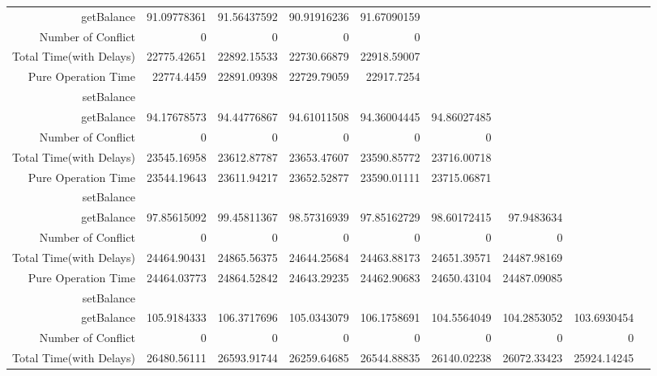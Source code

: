\begin{landscape}
\begin{table}[htbp]
\begin{tabular}{rrrrrrrrr}
    getBalance & 91.09778361 & 91.56437592 & 90.91916236 & 91.67090159 &       &       &       &  \\
    Number of Conflict & 0     & 0     & 0     & 0     &       &       &       &  \\
    Total Time(with Delays) & 22775.42651 & 22892.15533 & 22730.66879 & 22918.59007 &       &       &       &  \\
    Pure Operation Time & 22774.4459 & 22891.09398 & 22729.79059 & 22917.7254 &       &       &       &  \\
    \cline{1-9}
    setBalance &       &       &       &       &       &       &       &  \\
    getBalance & 94.17678573 & 94.44776867 & 94.61011508 & 94.36004445 & 94.86027485 &       &       &  \\
    Number of Conflict & 0     & 0     & 0     & 0     & 0     &       &       &  \\
    Total Time(with Delays) & 23545.16958 & 23612.87787 & 23653.47607 & 23590.85772 & 23716.00718 &       &       &  \\
    Pure Operation Time & 23544.19643 & 23611.94217 & 23652.52877 & 23590.01111 & 23715.06871 &       &       &  \\
    \cline{1-9}
    setBalance &       &       &       &       &       &       &       &  \\
    getBalance & 97.85615092 & 99.45811367 & 98.57316939 & 97.85162729 & 98.60172415 & 97.9483634 &       &  \\
    Number of Conflict & 0     & 0     & 0     & 0     & 0     & 0     &       &  \\
    Total Time(with Delays) & 24464.90431 & 24865.56375 & 24644.25684 & 24463.88173 & 24651.39571 & 24487.98169 &       &  \\
    Pure Operation Time & 24464.03773 & 24864.52842 & 24643.29235 & 24462.90683 & 24650.43104 & 24487.09085 &       &  \\
    \cline{1-9}
    setBalance &       &       &       &       &       &       &       &  \\
    getBalance & 105.9184333 & 106.3717696 & 105.0343079 & 106.1758691 & 104.5564049 & 104.2853052 & 103.6930454 &  \\
    Number of Conflict & 0     & 0     & 0     & 0     & 0     & 0     & 0     &  \\
    Total Time(with Delays) & 26480.56111 & 26593.91744 & 26259.64685 & 26544.88835 & 26140.02238 & 26072.33423 & 25924.14245 &  \\

\end{tabular}
\end{table}
\end{landscape}
